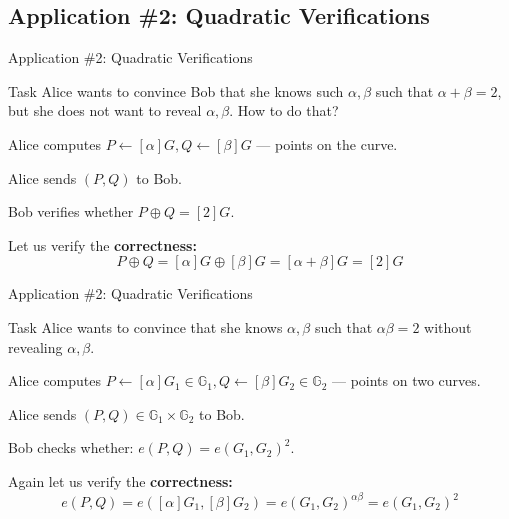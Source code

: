 \documentclass{zkdl-presentation-template}
\begin{document}
    \subsection{Application \#2: Quadratic Verifications}
    \begin{frame}{Application \#2: Quadratic Verifications}
        \begin{block}{Task}
            Alice wants to convince Bob that she knows such $\alpha,\beta$ such that $\alpha + \beta = 2$, but she does not want to reveal $\alpha,\beta$. How to do that?
        \end{block}

        \pause\begin{example}
            \begin{algoen}
                \item Alice computes $P \gets [\alpha]G, Q \gets [\beta]G$ --- points on the curve.
                \item \pause Alice sends $(P,Q)$ to Bob.
                \item \pause Bob verifies whether $P\oplus Q = [2]G$.
            \end{algoen}

            \pause Let us verify the \textbf{correctness:}
            \begin{equation*}
                P\oplus Q = [\alpha]G \oplus [\beta]G = [\alpha+\beta]G = [2]G
            \end{equation*}
        \end{example}
    \end{frame}

    \begin{frame}{Application \#2: Quadratic Verifications}
        \begin{block}{Task}
            Alice wants to convince that she knows $\alpha,\beta$ such that $\alpha\beta=2$ without revealing $\alpha,\beta$.
        \end{block}

        \pause\begin{example}
            \begin{algoen}
                \item Alice computes $P \gets [\alpha]G_1 \in \mathbb{G}_1, Q \gets [\beta]G_2 \in \mathbb{G}_2$ --- points on two curves.
                \item \pause Alice sends $(P,Q) \in \mathbb{G}_1 \times \mathbb{G}_2$ to Bob.
                \item \pause Bob checks whether: $e(P,Q) = e(G_1,G_2)^{2}$.
            \end{algoen}

            \pause Again let us verify the \textbf{correctness:}
            \begin{equation*}
                e(P,Q) = e([\alpha]G_1,[\beta]G_2) = e(G_1,G_2)^{\alpha\beta} = e(G_1,G_2)^{2}
            \end{equation*}
        \end{example}
    \end{frame}
\end{document}
